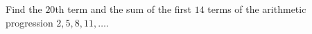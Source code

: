Find the $20$th term and the sum of the first $14$ terms of the arithmetic progression $2,5,8,11,\dots$.
